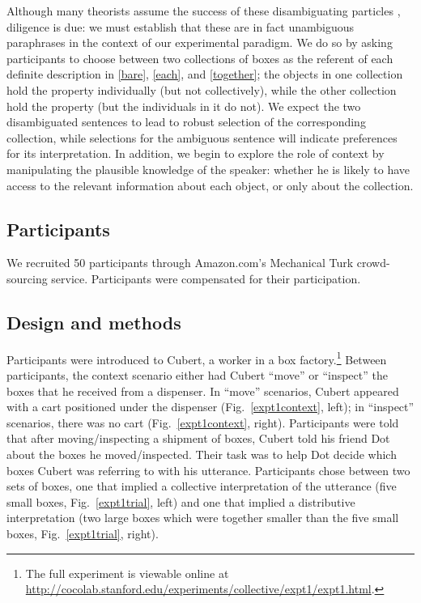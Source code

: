 \documentclass[linguex]{sp}
\begin{document}
Although many theorists assume the success of these disambiguating particles \citep[e.g.,][]{schwarzschild1994}, diligence is due: we must establish that these are in fact unambiguous paraphrases in the context of our experimental paradigm. We do so by asking participants to choose between two collections of boxes as the referent of each definite description in \ref{bare}, \ref{each}, and \ref{together}; the objects in one collection hold the property individually (but not collectively), while the other collection hold the property (but the individuals in it do not).
We expect the two disambiguated sentences to lead to robust selection of the corresponding collection, while selections for the ambiguous sentence will indicate preferences for its interpretation.
In addition, we begin to explore the role of context by manipulating the plausible knowledge of the speaker: whether he is likely to have access to the relevant information about each object, or only about the collection.

\subsection{Participants}

We recruited 50 participants through Amazon.com's Mechanical Turk crowd-sourcing service. Participants were compensated for their participation.


\subsection{Design and methods}

Participants were introduced to Cubert, a worker in a box factory.\footnote{The full experiment is viewable online at \url{http://cocolab.stanford.edu/experiments/collective/expt1/expt1.html}.} Between participants, the context scenario either had Cubert ``move'' or ``inspect'' the boxes that he received from a dispenser. In ``move'' scenarios, Cubert appeared with a cart positioned under the dispenser (Fig.~\ref{expt1context}, left); in ``inspect'' scenarios, there was no cart (Fig.~\ref{expt1context}, right). Participants were told that after moving/inspecting a shipment of boxes, Cubert told his friend Dot about the boxes he moved/inspected. Their task was to help Dot decide which boxes Cubert was referring to with his utterance. Participants chose between two sets of boxes, one that implied a collective interpretation of the utterance (five small boxes, Fig.\ \ref{expt1trial}, left) and one that implied a distributive interpretation (two large boxes which were together smaller than the five small boxes, Fig.\ \ref{expt1trial}, right).
\end{document}
